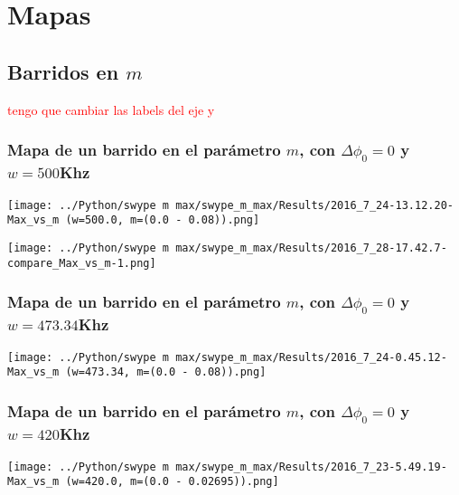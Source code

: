 \section{Mapas}

	\subsection{Barridos en $m$}
	\textcolor{red}{tengo que cambiar las labels del eje y}
	
		\subsubsection{Mapa de un barrido en el parámetro $m$, con $\Delta \phi_0 = 0 $ y $w=500$Khz}
		
			\begin{center}
				\texttt{[image: ../Python/swype m max/swype\_m\_max/Results/2016\_7\_24-13.12.20-Max\_vs\_m (w=500.0, m=(0.0 - 0.08)).png]}
				\label{fig: mapa m 500 }
			\end{center}
			
			
			\begin{center}
				\texttt{[image: ../Python/swype m max/swype\_m\_max/Results/2016\_7\_28-17.42.7-compare\_Max\_vs\_m-1.png]}
				\label{fig: mapa m 500 colores}
			\end{center}
			
			
		\subsubsection{Mapa de un barrido en el parámetro $m$, con $\Delta \phi_0 = 0 $ y $w=473.34$Khz}
		
			\begin{center}
				\texttt{[image: ../Python/swype m max/swype\_m\_max/Results/2016\_7\_24-0.45.12-Max\_vs\_m (w=473.34, m=(0.0 - 0.08)).png]}
				\label{fig: mapa m 379 histeresis}
			\end{center}
			
		
		\subsubsection{Mapa de un barrido en el parámetro $m$, con $\Delta \phi_0 = 0 $ y $w=420$Khz}
			
			\begin{center}
				\texttt{[image: ../Python/swype m max/swype\_m\_max/Results/2016\_7\_23-5.49.19-Max\_vs\_m (w=420.0, m=(0.0 - 0.02695)).png]}
				\label{fig: mapa m 420}
			\end{center}		
			
